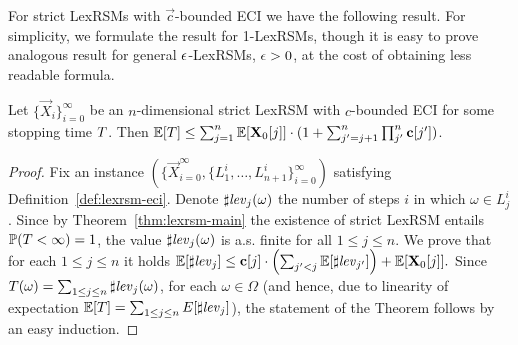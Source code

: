 For strict LexRSMs with $\vec{c}$-bounded ECI we have the following result. For 
simplicity, 
we formulate the result for 1-LexRSMs, though it is easy to prove analogous 
result for general $\epsilon$-LexRSMs, $\epsilon>0$, at the cost of obtaining less 
readable formula.

\begin{theorem}
\label{thm:runtime-bound}
\label{THM:RUNTIME-BOUND}
Let $\{\vec{X}_{i}\}_{i=0}^{\infty}$ be an 
$n$-dimensional strict LexRSM with $c$-bounded ECI for some stopping time $T$. 
Then $\mathbb{E}[T]\leq  
\sum_{j=1}^{n}\mathbb{E}[\mathbf{X}_{0}[j]]\cdot(1+\sum_{j'= j+1}^{n}\prod_{j'}^{n} 
\mathbf{c}[j'])$.
\end{theorem}
\begin{proof}
Fix an instance $(\{\vec{X}_{i=0}^{\infty},\{L_1^i,\dots,L_{n+1}^i\}_{i=0}^{\infty})$ satisfying Definition~\ref{def:lexrsm-eci}. Denote $\sharp\mathit{lev}_j(\omega)$ the number of steps $i$ in which $\omega\in 
L_j^i$. Since by Theorem~\ref{thm:lexrsm-main} the existence of strict LexRSM entails 
$\mathbb{P}(T<\infty)=1$, the value $\sharp\mathit{lev}_j(\omega)$ is a.s. finite for all $1\leq j \leq n$. 
We prove that for each $1\leq j \leq n$ it holds $\mathbb{E}[\sharp\mathit{lev}_j]\leq 
\mathbf{c}[j]\cdot\left(\sum_{j'<j}\mathbb{E}[\sharp\mathit{lev}_{j'}]\right) + 
\mathbb{E}[\mathbf{X}_{0}[j]].$ Since $T(\omega)=\sum_{1\leq j \leq n} 
\sharp\mathit{lev}_j(\omega)$, for each $\omega\in \Omega$ (and hence, due to 
linearity of expectation $\mathbb{E}[T]=\sum_{1\leq j \leq n} 
E[\sharp\mathit{lev}_j]$), the statement of the 
Theorem follows by an easy induction. 


\end{proof}
